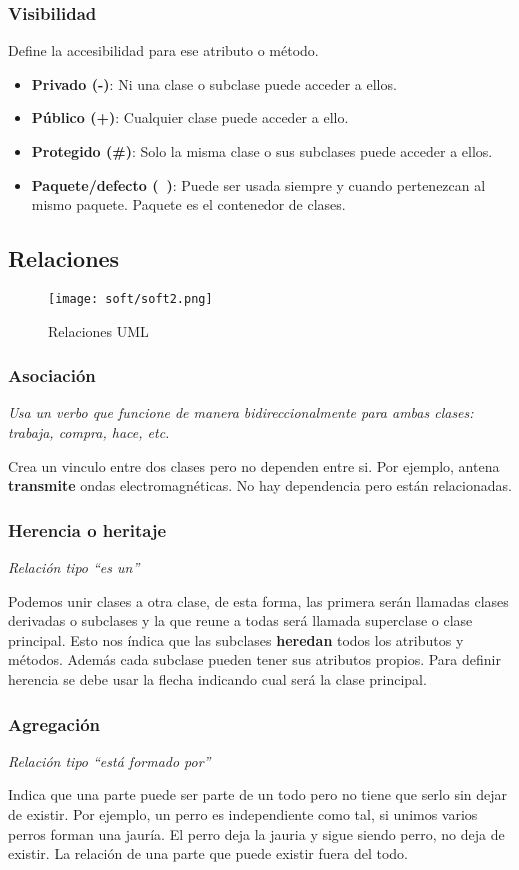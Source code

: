 \documentclass[
	12pt, %
	fleqn, %
	a4paper, %
	oneside, %
]{LegrandOrangeBook}
\begin{document}
\subsubsection*{Visibilidad}
Define la accesibilidad para ese atributo o método.
\begin{itemize}
\item \textbf{Privado (-)}: Ni una clase o subclase puede acceder a ellos.
\item \textbf{Público (+)}: Cualquier clase puede acceder a ello.
\item \textbf{Protegido (\#)}: Solo la misma clase o sus subclases puede acceder a ellos.
\item \textbf{Paquete/defecto (~)}: Puede ser usada siempre y cuando pertenezcan al mismo paquete. Paquete es el contenedor de clases.
\end{itemize}
\subsection{Relaciones}
\begin{figure}[H]
\centering
\texttt{[image: soft/soft2.png]}
\caption{Relaciones UML}
\end{figure}
\subsubsection*{Asociación}
\begin{flushright}
\textit{Usa un verbo que funcione de manera bidireccionalmente para ambas clases: trabaja, compra, hace, etc.}
\end{flushright}
Crea un vinculo entre dos clases pero no dependen entre si. Por ejemplo, antena \textbf{transmite} ondas electromagnéticas. No hay dependencia pero están relacionadas.
\subsubsection*{Herencia o heritaje}
\begin{flushright}
\textit{Relación tipo ``es un''}
\end{flushright}
Podemos unir clases a otra clase, de esta forma, las primera serán llamadas clases derivadas o subclases y la que reune a todas será llamada superclase o clase principal. Esto nos índica que las subclases \textbf{heredan} todos los atributos y métodos. Además cada subclase pueden tener sus atributos propios. Para definir herencia se debe usar la flecha indicando cual será la clase principal.
\subsubsection*{Agregación}
\begin{flushright}
\textit{Relación tipo ``está formado por''}
\end{flushright}
Indica que una parte puede ser parte de un todo pero no tiene que serlo sin dejar de existir. Por ejemplo, un perro es independiente como tal, si unimos varios perros forman una jauría. El perro deja la jauria y sigue siendo perro, no deja de existir. La relación de una parte que puede existir fuera del todo.
\end{document}
